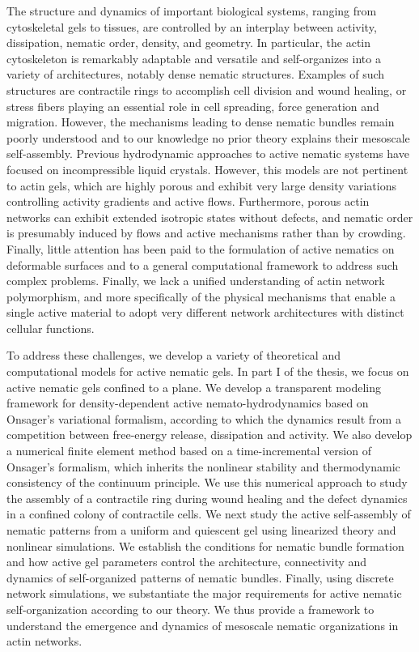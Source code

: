 

\begin{Abstract}
	The structure and dynamics of important biological systems, ranging from cytoskeletal gels to tissues, are controlled by an interplay between activity, dissipation, nematic order, density, and geometry. In particular, the actin cytoskeleton is remarkably adaptable and versatile and self-organizes into a variety of architectures, notably dense nematic structures. Examples of such structures are contractile rings to accomplish cell division and wound healing, or stress fibers  playing an essential role in cell spreading, force generation and migration. However, the mechanisms leading to dense nematic bundles remain poorly understood and to our knowledge no prior theory explains their mesoscale self-assembly. Previous hydrodynamic approaches to active nematic systems have focused on incompressible liquid crystals. However, this models are not pertinent to actin gels, which are highly porous and exhibit very large density variations controlling activity gradients and active flows. Furthermore, porous actin networks can exhibit extended isotropic states without defects, and nematic order is presumably induced by flows and active mechanisms rather than by crowding. Finally, little attention has been paid to the formulation of active nematics on deformable surfaces and to a general computational framework to address such complex problems. Finally, we lack a unified understanding of actin network polymorphism, and more specifically of the physical mechanisms that enable a single active material to adopt very different network architectures with distinct cellular functions. 

To address these challenges, we develop a variety of theoretical and computational models for active nematic gels. In part I of the thesis, we focus on active nematic gels confined to a plane. We develop a transparent modeling
	framework for density-dependent active nemato-hydrodynamics based on Onsager’s variational formalism, according to which the dynamics result from a competition between free-energy release, dissipation and activity. We also 	develop a numerical finite element method based on a time-incremental version of Onsager's formalism, which inherits the nonlinear stability and thermodynamic consistency of the continuum principle. We use this numerical approach to study the assembly of a contractile ring during wound healing and the defect dynamics in a confined colony of contractile cells. We next study the active self-assembly of nematic patterns from a uniform and quiescent gel using linearized theory and nonlinear simulations. We establish the conditions
	for nematic bundle formation and how active gel parameters control the architecture, 
	connectivity and dynamics of self-organized patterns of nematic bundles. Finally, using discrete
	network simulations, we substantiate the major requirements for active nematic self-organization according to our theory. We thus provide a framework to understand
	the emergence and dynamics of mesoscale nematic organizations in actin networks.
	

\end{Abstract}
